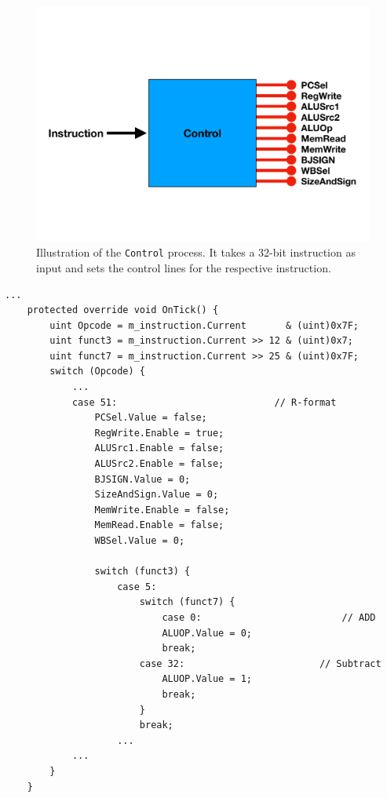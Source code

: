         
        \begin{figure}[h!]
            \centering
            \includegraphics[scale=0.35]{pictures/CONTROL.pdf}
            \caption{Illustration of the \texttt{Control} process. It takes a 32-bit instruction as input and sets the control lines for the respective instruction.}
            \label{fig:CONTROL}
        \end{figure}
    
        \begin{minipage}{\linewidth}
            \begin{lstlisting}[language={[Sharp]C}, caption={A slice of the \texttt{Control} process SME code. First 3 variables are declared for the extracted \texttt{opcode}, \texttt{funct3} and \texttt{func7} fields. They are then used in the following \texttt{switch} statements to correctly identify the given instruction. Finally the control lines are set with the values for the respective instruction.},captionpos=b, label = CONTROL]
...
    protected override void OnTick() {
        uint Opcode = m_instruction.Current       & (uint)0x7F;  
        uint funct3 = m_instruction.Current >> 12 & (uint)0x7;  
        uint funct7 = m_instruction.Current >> 25 & (uint)0x7F;
        switch (Opcode) {
            ...
            case 51:                            // R-format
                PCSel.Value = false;
                RegWrite.Enable = true;
                ALUSrc1.Enable = false;
                ALUSrc2.Enable = false;
                BJSIGN.Value = 0;
                SizeAndSign.Value = 0;
                MemWrite.Enable = false;
                MemRead.Enable = false;
                WBSel.Value = 0;
                
                switch (funct3) {
                    case 5:
                        switch (funct7) {
                            case 0:                         // ADD
                            ALUOP.Value = 0;
                            break;
                        case 32:                        // Subtract
                            ALUOP.Value = 1;
                            break;
                        }
                        break;
                    ...
            ...
        }
    }
            \end{lstlisting}
        \end{minipage} 
\newpage
